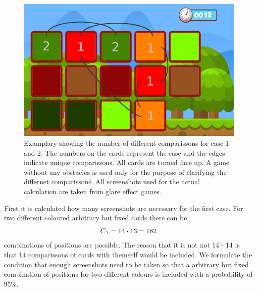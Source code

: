 \begin{figure}[H]
	\centering
	\includegraphics[width=15cm]{images/noObstTurnedNotes.png}
	\caption[Bild kurz]{Examplary showing the number of different comparissons for case 1 and 2. The numbers on the cards represent the case and the edges indicate unique comparissons. All cards are turned face up. A game without any obstacles is used only for the purpose of clarifying the differnet comparissons. All screenshots used for the actual calculation are taken from glare effect games.}
	\label{fig:noObstTurnedNotes}
\end{figure}

First it is calculated how many screenshots are necessary for the first case. For two different coloured arbitrary but fixed cards there can be 
\begin{equation*}
C\textsubscript{1} = 14 \cdot 13 = 182 
\end{equation*}
combinations of positions are possible. The reason that it is not not 14 $\cdot$ 14 is that 14 comparissons of cards with themself would be included. We formulate the condition that enough screenshots need to be taken so that a arbitrary but fixed combination of positions for two different colours is included with a probability of 95\%. 

